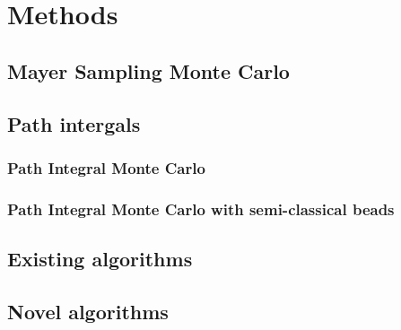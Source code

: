 \chapter{Methods}
\section{Mayer Sampling Monte Carlo}
\section{Path intergals}
\subsection{Path Integral Monte Carlo}
\subsection{Path Integral Monte Carlo with semi-classical beads}
\section{Existing algorithms}
\section{Novel algorithms}
